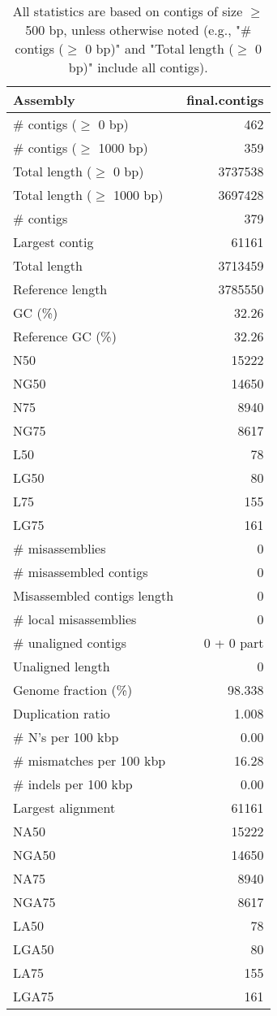 \documentclass[12pt,a4paper]{article}
\begin{document}
\begin{table}[ht]
\begin{center}
\caption{All statistics are based on contigs of size $\geq$ 500 bp, unless otherwise noted (e.g., "\# contigs ($\geq$ 0 bp)" and "Total length ($\geq$ 0 bp)" include all contigs).}
\begin{tabular}{|l*{1}{|r}|}
\hline
Assembly & final.contigs \\ \hline
\# contigs ($\geq$ 0 bp) & 462 \\ \hline
\# contigs ($\geq$ 1000 bp) & 359 \\ \hline
Total length ($\geq$ 0 bp) & 3737538 \\ \hline
Total length ($\geq$ 1000 bp) & 3697428 \\ \hline
\# contigs & 379 \\ \hline
Largest contig & 61161 \\ \hline
Total length & 3713459 \\ \hline
Reference length & 3785550 \\ \hline
GC (\%) & 32.26 \\ \hline
Reference GC (\%) & 32.26 \\ \hline
N50 & 15222 \\ \hline
NG50 & 14650 \\ \hline
N75 & 8940 \\ \hline
NG75 & 8617 \\ \hline
L50 & 78 \\ \hline
LG50 & 80 \\ \hline
L75 & 155 \\ \hline
LG75 & 161 \\ \hline
\# misassemblies & 0 \\ \hline
\# misassembled contigs & 0 \\ \hline
Misassembled contigs length & 0 \\ \hline
\# local misassemblies & 0 \\ \hline
\# unaligned contigs & 0 + 0 part \\ \hline
Unaligned length & 0 \\ \hline
Genome fraction (\%) & 98.338 \\ \hline
Duplication ratio & 1.008 \\ \hline
\# N's per 100 kbp & 0.00 \\ \hline
\# mismatches per 100 kbp & 16.28 \\ \hline
\# indels per 100 kbp & 0.00 \\ \hline
Largest alignment & 61161 \\ \hline
NA50 & 15222 \\ \hline
NGA50 & 14650 \\ \hline
NA75 & 8940 \\ \hline
NGA75 & 8617 \\ \hline
LA50 & 78 \\ \hline
LGA50 & 80 \\ \hline
LA75 & 155 \\ \hline
LGA75 & 161 \\ \hline
\end{tabular}
\end{center}
\end{table}
\end{document}
